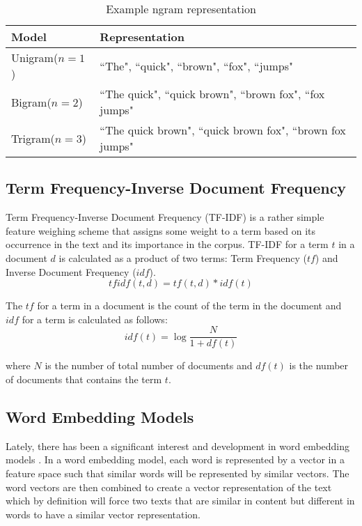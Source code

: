 \begin{table}[h]
\begin{center}
\caption{Example ngram representation}
\label{tbl:ngram_representation}
\begin{tabular}{p{3cm}p{8cm}}
\toprule 
Model&Representation\\
\midrule 
Unigram($n=1$)& ``The", ``quick", ``brown", ``fox", ``jumps" \\
Bigram($n=2$)& ``The quick", ``quick brown", ``brown fox", ``fox jumps" \\
Trigram($n=3$)& ``The quick brown", ``quick brown fox", ``brown fox jumps" \\
\bottomrule
\end{tabular}
\end{center}
\end{table}

\subsection{Term Frequency-Inverse Document Frequency}
Term Frequency-Inverse Document Frequency (TF-IDF)\cite{sparck1972statistical} is a rather simple feature weighing scheme that assigns some weight to a term based on its occurrence in the text and its importance in the corpus. TF-IDF for a term $t$ in a document $d$ is calculated as a product of two terms: Term Frequency ($tf$) and Inverse Document Frequency ($idf$). 
\begin{equation}
    \label{eq:tf_idf_equation}
    tfidf(t, d) = tf(t, d) * idf(t)
\end{equation}

The $tf$ for a term in a document is the count of the term in the document and $idf$ for a term is calculated as follows:
\begin{equation}
    \label{eq:idf_equation}
    idf(t) = \log{\frac{N}{1 + df(t)}}
\end{equation}

\noindent
where $N$ is the number of total number of documents and $df(t)$ is the number of documents that contains the term $t$.

\subsection{Word Embedding Models}
Lately, there has been a significant interest and development in word embedding models \cite{mikolov2013distributed, pennington2014glove, bojanowski2017enriching}. In a word embedding model, each word is represented by a vector in a feature space such that similar words will be represented by similar vectors\cite{mikolov2013distributed}. The word vectors are then combined to create a vector representation of the text which by definition will force two texts that are similar in content but different in words to have a similar vector representation.

